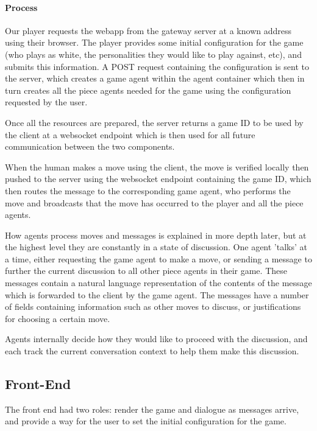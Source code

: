 \documentclass{article}
\begin{document}
\paragraph{Process}

Our player requests the webapp from the gateway server at a known address using their browser. The player provides some initial configuration for the game (who plays as white, the personalities they would like to play against, etc), and submits this information. A POST request containing the configuration is sent to the server, which creates a game agent within the agent container which then in turn creates all the piece agents needed for the game using the configuration requested by the user. 

Once all the resources are prepared, the server returns a game ID to be used by the client at a websocket endpoint which is then used for all future communication between the two components. 

When the human makes a move using the client, the move is verified locally then pushed to the server using the websocket endpoint containing the game ID, which then routes the message to the corresponding game agent, who performs the move and broadcasts that the move has occurred to the player and all the piece agents.

How agents process moves and messages is explained in more depth later, but at the highest level they are constantly in a state of discussion. One agent 'talks' at a time, either requesting the game agent to make a move, or sending a message to further the current discussion to all other piece agents in their game. These messages contain a natural language representation of the contents of the message which is forwarded to the client by the game agent. The messages have a number of fields containing information such as other moves to discuss, or justifications for choosing a certain move. 

Agents internally decide how they would like to proceed with the discussion, and each track the current conversation context to help them make this discussion. 

\subsection{Front-End}

The front end had two roles: render the game and dialogue as messages arrive, and provide a way for the user to set the initial configuration for the game. 
\end{document}
